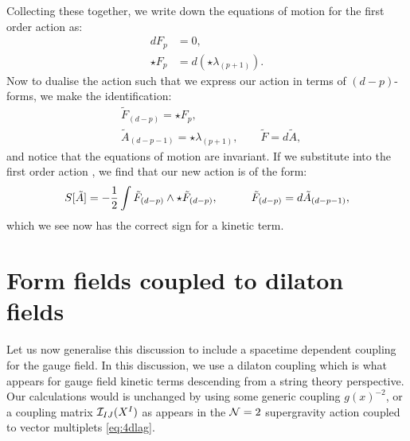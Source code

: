 Collecting these together, we write down the equations of motion for the first order action as:
\begin{equation*}
\begin{aligned}
	dF_{p} &= 0 ,\\
	\star F_{p} &= d(\star \lambda_{(p+1)}).
\end{aligned}
\end{equation*}
Now to dualise the action such that we express our action in terms of $(d-p)$-forms, we make the identification:
\begin{equation}
\label{eq:newhodgeduals}
	\begin{aligned}
		&\tilde{F}_{(d-p)} = \star F_{p}, \\
		&\tilde{A}_{(d-p-1)} = \star \lambda_{(p+1)}, \qquad \tilde{F} = d\tilde{A}  ,
	\end{aligned}
\end{equation}
and notice that the equations of motion are invariant. If we substitute  into the first order action , we find that our new action is of the form:
\begin{equation*}
S[\tilde{A}] = -\frac{1}{2} \int \tilde{F}_{(d-p)} \wedge \star \tilde{F}_{(d-p)}, \quad \qquad \tilde{F}_{(d-p)} = d\tilde{A}_{(d-p-1)},
\end{equation*}
which we see now has the correct sign for a kinetic term. 


\section{Form fields coupled to dilaton fields}

Let us now generalise this discussion to include a spacetime dependent coupling for the gauge field. In this discussion, we use a dilaton coupling which is what appears for gauge field kinetic terms descending from a string theory perspective. Our calculations would is unchanged by using some generic coupling $g(x)^{-2}$, or a coupling matrix ${\cal I}_{IJ}(X^I)$ as appears in the ${\cal N} = 2$ supergravity action coupled to vector multiplets \eqref{eq:4dlag}.   

